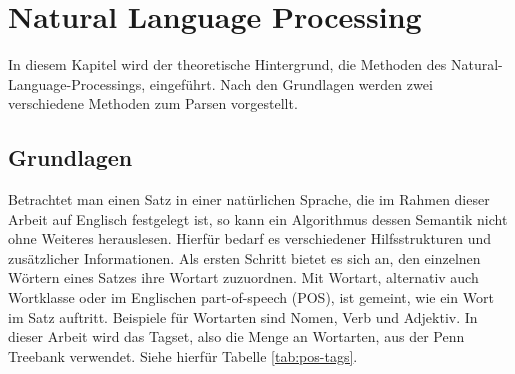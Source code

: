 %
\chapter{Natural Language Processing}
\label{sec:nlp}
In diesem Kapitel wird der theoretische Hintergrund, die Methoden des Natural-Language-Processings, eingeführt. Nach den Grundlagen werden zwei verschiedene Methoden zum Parsen vorgestellt. 

\section{Grundlagen}
\label{sec:nlp:grundlagen}

Betrachtet man einen Satz in einer natürlichen Sprache, die im Rahmen dieser Arbeit auf Englisch festgelegt ist, so kann ein Algorithmus dessen Semantik nicht ohne Weiteres herauslesen. Hierfür bedarf es verschiedener Hilfsstrukturen und zusätzlicher Informationen. Als ersten Schritt bietet es sich an, den einzelnen Wörtern eines Satzes ihre Wortart zuzuordnen. Mit Wortart, alternativ auch Wortklasse oder im Englischen part-of-speech (POS), ist gemeint, wie ein Wort im Satz auftritt. Beispiele für Wortarten sind Nomen, Verb und Adjektiv. In dieser Arbeit wird das Tagset, also die Menge an Wortarten, aus der Penn Treebank verwendet. Siehe hierfür Tabelle \ref{tab:pos-tags}.

